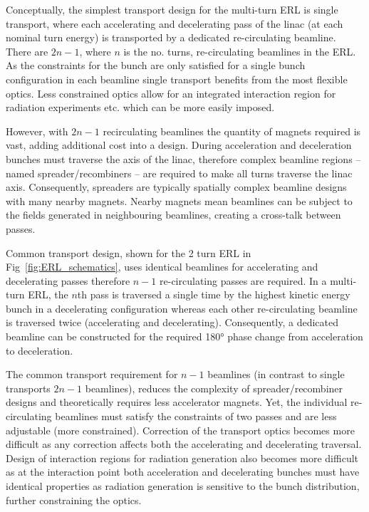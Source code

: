 \documentclass[../main.tex]{subfiles}
\begin{document}
Conceptually, the simplest transport design for the multi-turn ERL is single transport, where each accelerating and decelerating pass of the linac (at each nominal turn energy) is transported by a dedicated re-circulating beamline. There are $2n-1$, where $n$ is the no. turns, re-circulating beamlines in the ERL. As the constraints for the bunch are only satisfied for a single bunch configuration in each beamline single transport benefits from the most flexible optics. Less constrained optics allow for an integrated interaction region for radiation experiments etc. which can be more easily imposed. 

However, with $2n-1$ recirculating beamlines the quantity of magnets required is vast, adding additional cost into a design. During acceleration and deceleration bunches must traverse the axis of the linac, therefore complex beamline regions -- named spreader/recombiners -- are required to make all turns traverse the linac axis. Consequently, spreaders are typically spatially complex beamline designs with many nearby magnets. Nearby magnets mean beamlines can be subject to the fields generated in neighbouring beamlines, creating a cross-talk between passes.

Common transport design, shown for the 2 turn ERL in Fig~\ref{fig:ERL_schematics}, uses identical beamlines for accelerating and decelerating passes therefore $n-1$ re-circulating passes are required. In a multi-turn ERL, the $n$th pass is traversed a single time by the highest kinetic energy bunch in a decelerating configuration whereas each other re-circulating beamline is traversed twice (accelerating and decelerating). Consequently, a dedicated beamline can be constructed for the required 180\si{\degree} phase change from acceleration to deceleration.

The common transport requirement for $n-1$ beamlines (in contrast to single transports $2n-1$ beamlines), reduces the complexity of spreader/recombiner designs and theoretically requires less accelerator magnets. Yet, the individual re-circulating beamlines must satisfy the constraints of two passes and are less adjustable (more constrained). Correction of the transport optics becomes more difficult as any correction affects both the accelerating and decelerating traversal. Design of interaction regions for radiation generation also becomes more difficult as at the interaction point both acceleration and decelerating bunches must have identical properties as radiation generation is sensitive to the bunch distribution, further constraining the optics.
\end{document}
